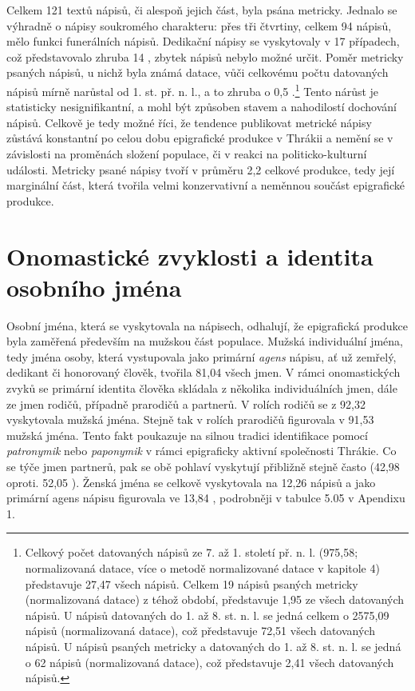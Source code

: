 Celkem 121 textů nápisů, či alespoň jejich část, byla psána metricky. Jednalo se výhradně o nápisy soukromého charakteru: přes tři čtvrtiny, celkem 94 nápisů, mělo funkci funerálních nápisů. Dedikační nápisy se vyskytovaly v 17 případech, což představovalo zhruba 14 , zbytek nápisů nebylo možné určit. Poměr metricky psaných nápisů, u nichž byla známá datace, vůči celkovému počtu datovaných nápisů mírně narůstal od 1. st. př. n. l., a to zhruba o 0,5 .\footnote{Celkový počet datovaných nápisů ze 7. až 1. století př. n. l. (975,58; normalizovaná datace, více o metodě normalizované datace v kapitole 4) představuje 27,47  všech nápisů. Celkem 19 nápisů psaných metricky (normalizovaná datace) z téhož období, představuje 1,95  ze všech datovaných nápisů. U nápisů datovaných do 1. až 8. st. n. l. se jedná celkem o 2575,09 nápisů (normalizovaná datace), což představuje 72,51  všech datovaných nápisů. U nápisů psaných metricky a datovaných do 1. až 8. st. n. l. se jedná o 62 nápisů (normalizovaná datace), což představuje 2,41  všech datovaných nápisů.} Tento nárůst je statisticky nesignifikantní, a mohl být způsoben stavem a nahodilostí dochování nápisů. Celkově je tedy možné říci, že tendence publikovat metrické nápisy zůstává konstantní po celou dobu epigrafické produkce v Thrákii a nemění se v závislosti na proměnách složení populace, či v reakci na politicko-kulturní události. Metricky psané nápisy tvoří v průměru 2,2  celkové produkce, tedy její marginální část, která tvořila velmi konzervativní a neměnnou součást epigrafické produkce.

\section[onomastické-zvyklosti-a-identita-osobního-jména]{Onomastické zvyklosti a identita osobního jména}

Osobní jména, která se vyskytovala na nápisech, odhalují, že epigrafická produkce byla zaměřená především na mužskou část populace. Mužská individuální jména, tedy jména osoby, která vystupovala jako primární {\em agens} nápisu, ať už zemřelý, dedikant či honorovaný člověk, tvořila 81,04  všech jmen. V rámci onomastických zvyků se primární identita člověka skládala z několika individuálních jmen, dále ze jmen rodičů, případně prarodičů a partnerů. V rolích rodičů se z 92,32  vyskytovala mužská jména. Stejně tak v rolích prarodičů figurovala v 91,53  mužská jména. Tento fakt poukazuje na silnou tradici identifikace pomocí {\em patronymik} nebo {\em paponymik} v rámci epigraficky aktivní společnosti Thrákie. Co se týče jmen partnerů, pak se obě pohlaví vyskytují přibližně stejně často (42,98  oproti. 52,05 ). Ženská jména se celkově vyskytovala na 12,26  nápisů a jako primární agens nápisu figurovala ve 13,84 , podrobněji v tabulce 5.05 v Apendixu 1.

